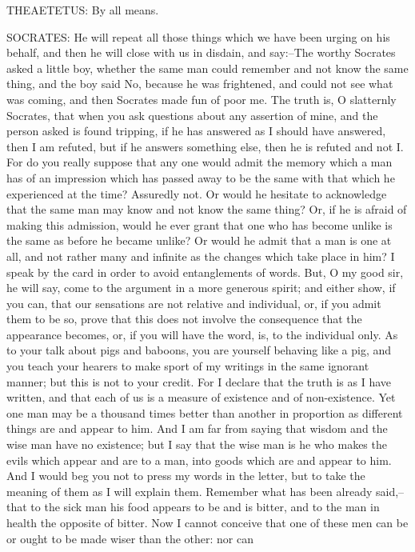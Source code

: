 THEAETETUS: By all means.

SOCRATES: He will repeat all those things which we have been urging on
his behalf, and then he will close with us in disdain, and say:--The
worthy Socrates asked a little boy, whether the same man could remember
and not know the same thing, and the boy said No, because he was
frightened, and could not see what was coming, and then Socrates made
fun of poor me. The truth is, O slatternly Socrates, that when you ask
questions about any assertion of mine, and the person asked is found
tripping, if he has answered as I should have answered, then I am
refuted, but if he answers something else, then he is refuted and not
I. For do you really suppose that any one would admit the memory which a
man has of an impression which has passed away to be the same with that
which he experienced at the time? Assuredly not. Or would he hesitate to
acknowledge that the same man may know and not know the same thing? Or,
if he is afraid of making this admission, would he ever grant that one
who has become unlike is the same as before he became unlike? Or would
he admit that a man is one at all, and not rather many and infinite as
the changes which take place in him? I speak by the card in order to
avoid entanglements of words. But, O my good sir, he will say, come to
the argument in a more generous spirit; and either show, if you can,
that our sensations are not relative and individual, or, if you admit
them to be so, prove that this does not involve the consequence that the
appearance becomes, or, if you will have the word, is, to the individual
only. As to your talk about pigs and baboons, you are yourself behaving
like a pig, and you teach your hearers to make sport of my writings in
the same ignorant manner; but this is not to your credit. For I declare
that the truth is as I have written, and that each of us is a measure
of existence and of non-existence. Yet one man may be a thousand times
better than another in proportion as different things are and appear
to him. And I am far from saying that wisdom and the wise man have no
existence; but I say that the wise man is he who makes the evils which
appear and are to a man, into goods which are and appear to him. And
I would beg you not to press my words in the letter, but to take the
meaning of them as I will explain them. Remember what has been already
said,--that to the sick man his food appears to be and is bitter, and to
the man in health the opposite of bitter. Now I cannot conceive that one
of these men can be or ought to be made wiser than the other: nor can
